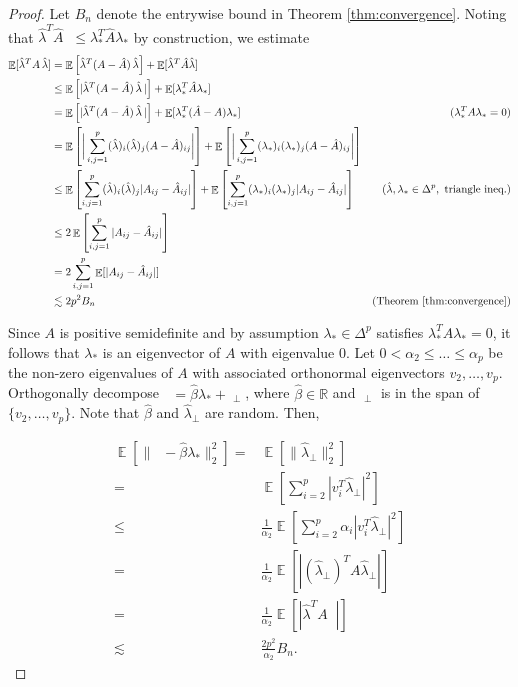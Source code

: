 \documentclass[nohyperref]{article}
\DeclareMathOperator*{\E}{\mathbb{E}}
\DeclareMathOperator*{\hatlambda}{\hat{\lambda}}
\theoremstyle{definition}
\begin{document}
\begin{proof}
Let $B_{n}$ denote the entrywise bound in Theorem \ref{thm:convergence}.  Noting that $\hat{\lambda}^{T}\hat{A}\hatlambda\le \lambda_{*}^{T}\hat{A}\lambda_{*}$ by construction, we estimate 
\begin{align*}
    \E[\hat{\lambda}^{T}A\hatlambda] 
    &= \E\left[\hat{\lambda}^{T}(A-\hat{A})\hatlambda\right]+\E[\hat{\lambda}^{T}\hat{A}\hat{\lambda}] \\
    &\leq \E\left[|\hat{\lambda}^{T}(A-\hat{A})\hatlambda|\right] +\E[\lambda_{*}^{T}\hat{A}\lambda_{*}]\\
    &= \E\left[|\hat{\lambda}^{T}(A-\hat{A})\hatlambda|\right]+\E[\lambda_{*}^{T}(\hat{A}-A)\lambda_{*}]\,\, & (\lambda_*^TA\lambda_* = 0) \\
    &= \E\left[\bigg| \sum_{i,j=1}^p (\hat{\lambda})_{i}(\hat{\lambda})_{j} (A - \hat{A})_{ij}\bigg|\right]+
        \E\left[\bigg| \sum_{i,j=1}^p (\lambda_{*})_{i}(\lambda_{*})_{j} (A - \hat{A})_{ij}\bigg|\right] \\
    &\le \E\left[ \sum_{i,j=1}^p (\hat{\lambda})_{i}(\hat{\lambda})_{j} |A_{ij} - \hat{A}_{ij}|\right] + 
        \E\left[\sum_{i,j=1}^p (\lambda_{*})_{i}(\lambda_{*})_{j} |A_{ij} - \hat{A}_{ij}|\right] & (\hat{\lambda}, \lambda_* \in \Delta^p, \text{ triangle ineq.})\\
    &\le 2\E\left[\sum_{i,j=1}^p |A_{ij} - \hat{A}_{ij}|\right] \\
    &= 2\sum_{i,j=1}^p \E[|A_{ij} - \hat{A}_{ij}|] \\
    & \lesssim 2p^{2}B_{n} & (\text{Theorem \ref{thm:convergence}})
\end{align*}

Since $A$ is positive semidefinite and by assumption $\lambda_{*}\in\Delta^{p}$ satisfies $\lambda_{*}^{T}A\lambda_{*}=0$, it follows that $\lambda_{*}$ is an eigenvector of $A$ with eigenvalue 0.  Let $0<\alpha_{2}\le\dots\le\alpha_{p}$ be the non-zero eigenvalues of $A$ with associated orthonormal eigenvectors $v_{2},\dots,v_{p}$. Orthogonally decompose $\hatlambda=\hat{\beta}\lambda_{*}+\hatlambda_{\perp}$, where $\hat{\beta}\in \mathbb{R}$ and $\hatlambda_{\perp}$ is in the span of $\{v_{2},\dots,v_{p}\}$.  Note that $\hat{\beta}$ and $\hat{\lambda}_{\perp}$ are random.  Then,%

\begin{align*}\E[\|\hatlambda-\hat{\beta}\lambda_{*}\|_{2}^2]=&\E[\|\hat{\lambda}_{\perp}\|_{2}^2]\\
=&\E\left[\sum_{i=2}^{p}|v_{i}^{T}\hat{\lambda}_{\perp}|^{2}\right]\\
\le& \frac{1}{\alpha_{2}}\E\left[\sum_{i=2}^{p}\alpha_{i}|v_{i}^{T}\hat{\lambda}_{\perp}|^{2}\right]\\
=&\frac{1}{\alpha_{2}}\E[|(\hat{\lambda}_{\perp})^{T}A\hat{\lambda}_{\perp}|]\\
=&\frac{1}{\alpha_{2}}\E[|\hat{\lambda}^{T}A\hatlambda|]\\
\lesssim & \frac{2 p^{2}}{\alpha_{2}}B_{n}.
\end{align*}


\end{proof}
\end{document}
